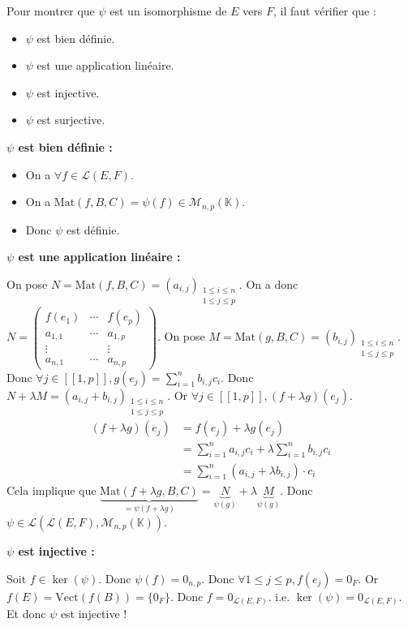 \documentclass[11pt, a4paper]{article}
\theoremstyle{definition}
\begin{document}
Pour montrer que $\psi$ est un isomorphisme de $E$ vers $F$, il faut vérifier que :
\begin{itemize}
	\item $\psi$ est bien définie.
	\item $\psi$ est une application linéaire.
	\item $\psi$ est injective.
	\item $\psi$ est surjective.
\end{itemize}
\textbf{$\psi$ est bien définie :}
\begin{itemize}
	\item On a $\forall f \in \mathcal L(E,F)$.
	\item On a $\mathrm{Mat}(f,B,C) = \psi(f) \in \mathcal M_{n,p}(\mathbb{K})$.
	\item Donc $\psi$ est définie.
\end{itemize}
\textbf{$\psi$ est une application linéaire :}
\begin{outline}
\1 On pose $N = \mathrm{Mat}(f,B,C) = (a_{i,j})_{\substack{1 \le i \le n\\ 1 \le j \le p}}$.
\2 On a donc $N = \left(\begin{matrix} f(e_1) & \cdots & f(e_p)\\
a_{1,1} & \cdots & a_{1,p} \\
\vdots & & \vdots \\
a_{n,1} & \cdots & a_{n,p}
\end{matrix}\right)$.
\1 On pose $M = \mathrm{Mat}(g,B,C) = (b_{i,j})_{\substack{1 \le i \le n\\ 1 \le j \le p}}$.
\2 Donc $\forall j \in [\![1,p]\!], g(e_j) = \sum_{i=1}^{n}b_{i,j}c_i$.
\1 Donc $N + \lambda M = (a_{i,j} + b_{i,j})_{\substack{1 \le i \le n\\ 1 \le j \le p}}$.
\1 Or $\forall j \in [\![1,p]\!], (f+\lambda g)(e_j)$.
\begin{align*}
	(f+ \lambda g)(e_j) &= f(e_j) + \lambda g(e_j)\\
	&= \sum_{i=1}^n a_{i,j} c_i + \lambda \sum_{i=1}^{n}b_{i,j}c_i\\
	&= \sum_{i=1}^{n}(a_{i,j}+\lambda b_{i,j})\cdot c_i
\end{align*}
\1 Cela implique que $\underbrace{\mathrm{Mat}(f+\lambda g,B,C)}_{=\psi(f+\lambda g)}= \underbrace{N}_{\psi(g)} + \lambda \underbrace{M}_{\psi(g)}$.
\1 Donc $\psi \in \mathcal L(\mathcal L(E,F), \mathcal M_{n,p}(\mathbb{K}))$.
\end{outline}
\textbf{$\psi$ est injective :}
\begin{outline}
\1 Soit $f \in \ker(\psi)$. Donc $\psi(f) = 0_{n,p}$.
\1 Donc $\forall 1 \le j \le p, f(e_j) = 0_F$.
\1 Or $f(E) = \mathrm{Vect}(f(B)) = \{0_F\}$.
\1 Donc $f = 0_{\mathcal L(E,F)}$.
\1 i.e. $\ker(\psi) = 0_{\mathcal L(E,F)}$.
\1 Et donc $\psi$ est injective !
\end{outline}
\end{document}
